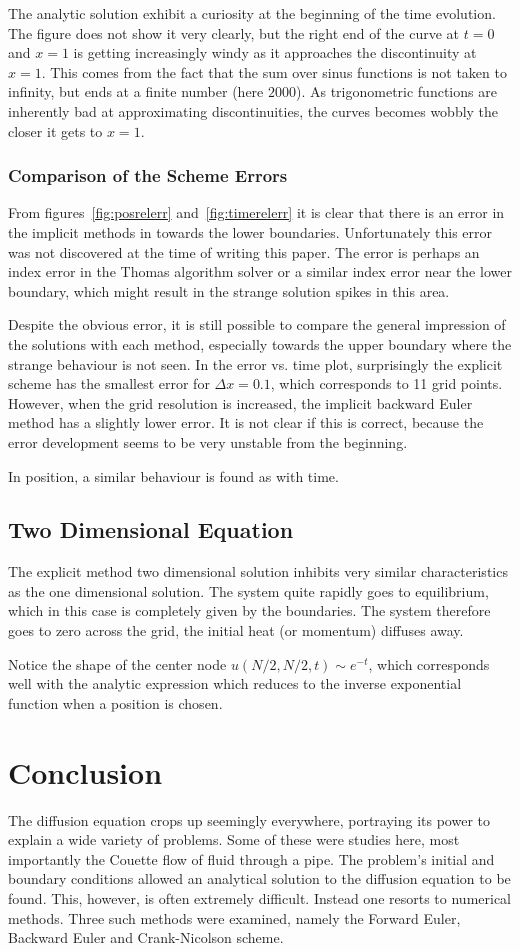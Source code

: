 \documentclass[aps,reprint]{revtex4-1}
\begin{document}
The analytic solution exhibit a curiosity at the beginning of the time evolution. The figure does not
show it very clearly, but the right end of the curve at \(t=0\) and \(x=1\) is
getting increasingly windy as it approaches the discontinuity at \(x=1\). This
comes from the fact that the sum over sinus functions is not taken to infinity,
but ends at a finite number (here \(2000\)). As trigonometric functions are
inherently bad at approximating discontinuities, the curves becomes wobbly the
closer it gets to \(x=1\).
\subsubsection{Comparison of the Scheme Errors}
From figures~\ref{fig:posrelerr} and~\ref{fig:timerelerr} it is clear that there is
an error in the implicit methods in towards the lower boundaries. Unfortunately
this error was not discovered at the time of writing this paper. The error is
perhaps an index error in the Thomas algorithm solver or a similar index error
near the lower boundary, which might result in the strange solution spikes in this
area.

Despite the obvious error, it is still possible to compare the general impression
of the solutions with each method, especially towards the upper boundary where
the strange behaviour is not seen. In the error vs. time plot, surprisingly
the explicit scheme has the smallest error for $\Delta x = 0.1$, which corresponds to
11 grid points. However, when the grid resolution is increased, the implicit backward Euler method
has a slightly lower error. It is not clear if this is correct, because the error development
seems to be very unstable from the beginning.

In position, a similar behaviour is found as with time.
\subsection{Two Dimensional Equation}
The explicit method two dimensional solution inhibits very similar characteristics
as the one dimensional solution. The system quite rapidly goes to equilibrium,
which in this case is completely given by the boundaries. The system therefore
goes to zero across the grid, the initial heat (or momentum) diffuses away.

Notice the shape of the center node $u(N/2, N/2, t) \sim e^{-t}$, which corresponds
well with the analytic expression which reduces to the inverse exponential function when
a position is chosen.
\section{Conclusion} \label{sec:conclusion}
The diffusion equation crops up seemingly everywhere, portraying its power to
explain a wide variety of problems. Some of these were studies here, most
importantly the Couette flow of fluid through a pipe. The problem's initial and
boundary conditions allowed an analytical solution to the diffusion equation to
be found. This, however, is often extremely difficult. Instead one resorts to
numerical methods. Three such methods were examined, namely the Forward Euler,
Backward Euler and Crank-Nicolson scheme.
\end{document}
